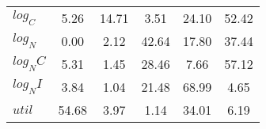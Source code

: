 \begin{center}
\begin{longtable}{lccccc}
$log_C         $	 & 	        5.26	 & 	       14.71	 & 	        3.51	 & 	       24.10	 & 	       52.42 \\ 
$log_N         $	 & 	        0.00	 & 	        2.12	 & 	       42.64	 & 	       17.80	 & 	       37.44 \\ 
$log_NC        $	 & 	        5.31	 & 	        1.45	 & 	       28.46	 & 	        7.66	 & 	       57.12 \\ 
$log_NI        $	 & 	        3.84	 & 	        1.04	 & 	       21.48	 & 	       68.99	 & 	        4.65 \\ 
$util          $	 & 	       54.68	 & 	        3.97	 & 	        1.14	 & 	       34.01	 & 	        6.19 \\ 
\end{longtable}
 \end{center}
